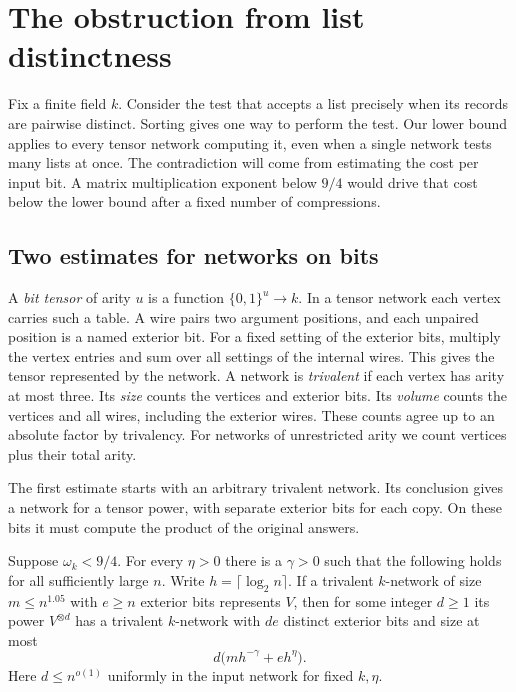 \section{The obstruction from list distinctness}\label{sec:obstruction}
Fix a finite field \(k\). Consider the test that accepts a list precisely when
its records are pairwise distinct. Sorting gives one way to perform the
test. Our lower bound applies to every tensor network computing it, even
when a single network tests many lists at once. The contradiction will
come from estimating the cost per input bit. A matrix multiplication
exponent below \(9/4\) would drive that cost below the lower bound after
a fixed number of compressions.

\subsection{Two estimates for networks on bits}
A \emph{bit tensor} of arity \(u\) is a function \(\{0,1\}^u\to k\).
In a tensor network each vertex carries such a table. A wire pairs two
argument positions, and each unpaired position is a named exterior bit.
For a fixed setting of the exterior bits, multiply the vertex entries
and sum over all settings of the internal wires. This gives the tensor
represented by the network. A network is \emph{trivalent} if each
vertex has arity at most three. Its \emph{size} counts the vertices and
exterior bits. Its \emph{volume} counts the vertices and all wires,
including the exterior wires. These counts agree up to an absolute
factor by trivalency. For networks of unrestricted arity we count
vertices plus their total arity.

The first estimate starts with an arbitrary trivalent network. Its
conclusion gives a network for a tensor power, with separate exterior
bits for each copy. On these bits it must compute the product of the
original answers.

\begin{theorem}\label{thm:shaving}
Suppose \(\omega_k<9/4\). For every \(\eta>0\) there is a \(\gamma>0\)
such that the following holds for all sufficiently large \(n\).
Write \(h=\lceil\log_2 n\rceil\). If a trivalent \(k\)-network of size
\(m\le n^{1.05}\) with \(e\ge n\) exterior bits represents \(V\), then
for some integer \(d\ge1\) its power \(V^{\otimes d}\) has a trivalent
\(k\)-network with \(de\) distinct exterior bits and size at most
\begin{equation}\label{eq:shave}
                   d\big(mh^{-\gamma}+eh^\eta\big).
\end{equation}
Here \(d\le n^{o(1)}\) uniformly in the input network for fixed \(k,\eta\).
\end{theorem}

